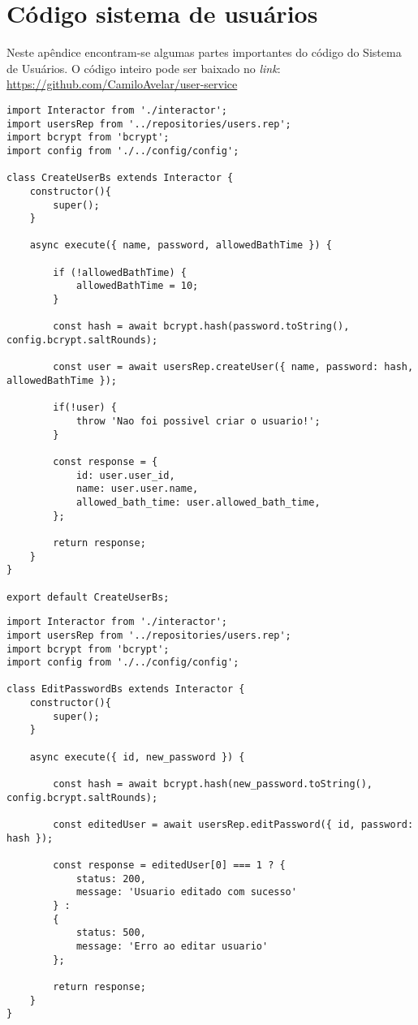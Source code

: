 \chapter{Código sistema de usuários}

Neste apêndice encontram-se algumas partes importantes do código do Sistema de Usuários. O código inteiro pode ser baixado no \textit{link}: \url{https://github.com/CamiloAvelar/user-service}

\begin{lstlisting}[caption=Exemplo do código do \textit{interactor} de criação do usuário]
import Interactor from './interactor';
import usersRep from '../repositories/users.rep';
import bcrypt from 'bcrypt';
import config from './../config/config';

class CreateUserBs extends Interactor {
	constructor(){
		super();
	}
	
	async execute({ name, password, allowedBathTime }) {
	
		if (!allowedBathTime) {
			allowedBathTime = 10;
		}
	
		const hash = await bcrypt.hash(password.toString(), config.bcrypt.saltRounds);
	
		const user = await usersRep.createUser({ name, password: hash, allowedBathTime });
		
		if(!user) {
			throw 'Nao foi possivel criar o usuario!';
		}
		
		const response = {
			id: user.user_id,
			name: user.user.name,
			allowed_bath_time: user.allowed_bath_time,
		};
		
		return response;
	}
}

export default CreateUserBs;
\end{lstlisting}

\begin{lstlisting}[caption=Exemplo do código do \textit{interactor} de edição de senha de usuários]
import Interactor from './interactor';
import usersRep from '../repositories/users.rep';
import bcrypt from 'bcrypt';
import config from './../config/config';

class EditPasswordBs extends Interactor {
	constructor(){
		super();
	}
	
	async execute({ id, new_password }) {
	
		const hash = await bcrypt.hash(new_password.toString(), config.bcrypt.saltRounds);
		
		const editedUser = await usersRep.editPassword({ id, password: hash });
		
		const response = editedUser[0] === 1 ? {
			status: 200,
			message: 'Usuario editado com sucesso'
		} : 
		{
			status: 500,
			message: 'Erro ao editar usuario'
		};
		
		return response;
	}
}
\end{lstlisting}

